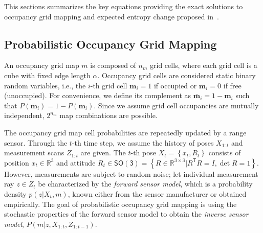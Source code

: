 \documentclass[smallextended]{svjour3}       %
\newcommand{\braces}[1]{\ensuremath{\left\{ #1 \right\}}}
\newcommand{\SO}{\ensuremath{\mathsf{SO(3)}}}
\newcommand{\T}{\ensuremath{\mathsf{T}}}
\renewcommand{\Re}{\ensuremath{\mathbb{R}}}
\begin{document}
This sections summarizes the key equations providing the exact solutions to occupancy grid mapping and expected entropy change proposed in~\cite{KauLeeAiMos16,KauTakAiLee17,KauTakAiLee18,KauAiLee16}.

\subsection{Probabilistic Occupancy Grid Mapping}
\label{subsec:POGM}
An occupancy grid map $m$ is composed of $n_m$ grid cells, where each grid cell is a cube with fixed edge length $\alpha$. Occupancy grid cells are considered static binary random variables, i.e., the $i$-th grid cell $\mathbf{m}_i=1$ if occupied or $\mathbf{m}_i=0$ if free (unoccupied). For convenience, we define its complement as $\bar{\mathbf{m}}_i=1-\mathbf{m}_i$ such that $P(\bar{\mathbf{m}}_i)=1-P(\mathbf{m}_i)$. Since we assume grid cell occupancies are mutually independent, $2^{n_m}$ map combinations are possible.

The occupancy grid map cell probabilities are repeatedly updated by a range sensor. Through the $t$-th time step, we assume the history of poses $X_{1:t}$ and measurement scans $Z_{1:t}$ are given. The $t$-th pose $X_t=\braces{x_t,R_t}$ consists of position $x_t\in\Re^3$ and attitude $R_t\in\SO=\braces{R\in\Re^{3\times3}|R^\T R=I,\det{R}=1}$. However, measurements are subject to random noise; let individual measurement ray $z\in Z_t$ be characterized by the \emph{forward sensor model}, which is a probability density $p(z|X_t,m)$, known either from the sensor manufacturer or obtained empirically. The goal of probabilistic occupancy grid mapping is using the stochastic properties of the forward sensor model to obtain the \emph{inverse sensor model}, $P(m|z,X_{1:t},Z_{1:t-1})$.
\end{document}

